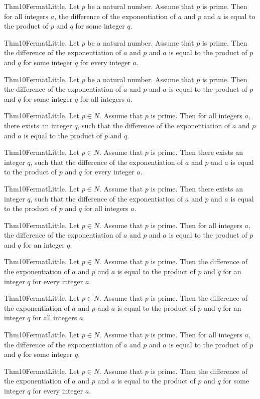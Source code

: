 \documentclass{article}
\begin{document}
Thm10FermatLittle. Let $p$ be a natural number. Assume that $p$ is prime. Then for all integers $a$, the difference of the exponentiation of $a$ and $p$ and $a$ is equal to the product of $p$ and $q$ for some integer $q$.

Thm10FermatLittle. Let $p$ be a natural number. Assume that $p$ is prime. Then the difference of the exponentiation of $a$ and $p$ and $a$ is equal to the product of $p$ and $q$ for some integer $q$ for every integer $a$.

Thm10FermatLittle. Let $p$ be a natural number. Assume that $p$ is prime. Then the difference of the exponentiation of $a$ and $p$ and $a$ is equal to the product of $p$ and $q$ for some integer $q$ for all integers $a$.

Thm10FermatLittle. Let $p \in N$. Assume that $p$ is prime. Then for all integers $a$, there exists an integer $q$, such that the difference of the exponentiation of $a$ and $p$ and $a$ is equal to the product of $p$ and $q$.

Thm10FermatLittle. Let $p \in N$. Assume that $p$ is prime. Then there exists an integer $q$, such that the difference of the exponentiation of $a$ and $p$ and $a$ is equal to the product of $p$ and $q$ for every integer $a$.

Thm10FermatLittle. Let $p \in N$. Assume that $p$ is prime. Then there exists an integer $q$, such that the difference of the exponentiation of $a$ and $p$ and $a$ is equal to the product of $p$ and $q$ for all integers $a$.

Thm10FermatLittle. Let $p \in N$. Assume that $p$ is prime. Then for all integers $a$, the difference of the exponentiation of $a$ and $p$ and $a$ is equal to the product of $p$ and $q$ for an integer $q$.

Thm10FermatLittle. Let $p \in N$. Assume that $p$ is prime. Then the difference of the exponentiation of $a$ and $p$ and $a$ is equal to the product of $p$ and $q$ for an integer $q$ for every integer $a$.

Thm10FermatLittle. Let $p \in N$. Assume that $p$ is prime. Then the difference of the exponentiation of $a$ and $p$ and $a$ is equal to the product of $p$ and $q$ for an integer $q$ for all integers $a$.

Thm10FermatLittle. Let $p \in N$. Assume that $p$ is prime. Then for all integers $a$, the difference of the exponentiation of $a$ and $p$ and $a$ is equal to the product of $p$ and $q$ for some integer $q$.

Thm10FermatLittle. Let $p \in N$. Assume that $p$ is prime. Then the difference of the exponentiation of $a$ and $p$ and $a$ is equal to the product of $p$ and $q$ for some integer $q$ for every integer $a$.
\end{document}
